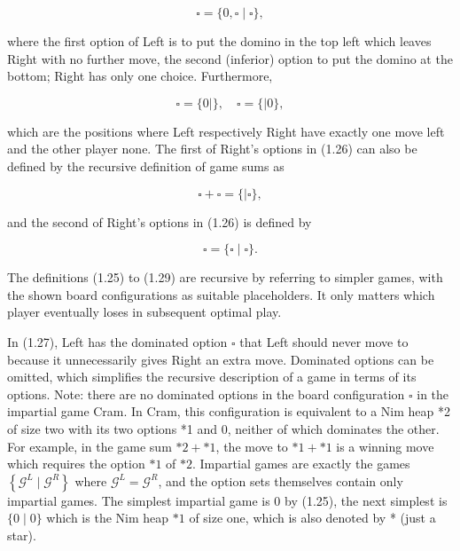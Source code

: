 \documentclass[12pt]{article}
\begin{document}
\begin{equation*}
\square=\{0, \square \mid \square\}, \tag{1.27}
\end{equation*}


where the first option of Left is to put the domino in the top left which leaves Right with no further move, the second (inferior) option to put the domino at the bottom; Right has only one choice. Furthermore,


\begin{equation*}
\square=\{0 \mid\}, \quad \square=\{\mid 0\}, \tag{1.28}
\end{equation*}


which are the positions where Left respectively Right have exactly one move left and the other player none. The first of Right's options in (1.26) can also be defined by the recursive definition of game sums as

$$
\square+\square=\{\mid \square\},
$$

and the second of Right's options in (1.26) is defined by


\begin{equation*}
\square=\{\square \mid \square\} . \tag{1.29}
\end{equation*}


The definitions (1.25) to (1.29) are recursive by referring to simpler games, with the shown board configurations as suitable placeholders. It only matters which player eventually loses in subsequent optimal play.

In (1.27), Left has the dominated option $\square$ that Left should never move to because it unnecessarily gives Right an extra move. Dominated options can be omitted, which simplifies the recursive description of a game in terms of its options. Note: there are no dominated options in the board configuration $\square$ in the impartial game Cram. In Cram, this configuration is equivalent to a Nim heap *2 of size two with its two options *1 and 0, neither of which dominates the other. For example, in the game sum $* 2+* 1$, the move to $* 1+* 1$ is a winning move which requires the option $* 1$ of $* 2$. Impartial games are exactly the games $\left\{\mathcal{G}^{L} \mid \mathcal{G}^{R}\right\}$ where $\mathcal{G}^{L}=\mathcal{G}^{R}$, and the option sets themselves contain only impartial games. The simplest impartial game is 0 by (1.25), the next simplest is $\{0 \mid 0\}$ which is the Nim heap $* 1$ of size one, which is also denoted by * (just a star).
\end{document}
